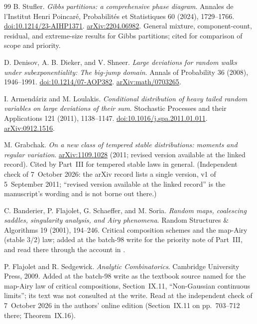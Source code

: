 \documentclass[11pt]{article}
\theoremstyle{remark}\newtheorem{remark}[theorem]{Remark}
\theoremstyle{definition}\newtheorem{definition}[theorem]{Definition}
\begin{document}
\begin{thebibliography}{99}
B. Stufler.
\emph{Gibbs partitions: a comprehensive phase diagram}.
Annales de l'Institut Henri Poincar\'e, Probabilit\'es et Statistiques
60 (2024), 1729--1766.
\href{https://doi.org/10.1214/23-AIHP1371}{doi:10.1214/23-AIHP1371}.
\href{https://arxiv.org/abs/2204.06982}{arXiv:2204.06982}.
General mixture, component-count, residual, and extreme-size results
for Gibbs partitions; cited for comparison of scope and priority.

D. Denisov, A. B. Dieker, and V. Shneer.
\emph{Large deviations for random walks under subexponentiality:
The big-jump domain}.
Annals of Probability 36 (2008), 1946--1991.
\href{https://doi.org/10.1214/07-AOP382}{doi:10.1214/07-AOP382}.
\href{https://arxiv.org/abs/math/0703265}{arXiv:math/0703265}.

I. Armend\'ariz and M. Loulakis.
\emph{Conditional distribution of heavy tailed random variables
on large deviations of their sum}.
Stochastic Processes and their Applications 121 (2011), 1138--1147.
\href{https://doi.org/10.1016/j.spa.2011.01.011}{doi:10.1016/j.spa.2011.01.011}.
\href{https://arxiv.org/abs/0912.1516}{arXiv:0912.1516}.

M. Grabchak.
\emph{On a new class of tempered stable distributions: moments and regular variation}.
\href{https://arxiv.org/abs/1109.1028}{arXiv:1109.1028} (2011; revised version available at the linked record).
Cited by Part~III for tempered stable laws in general. (Independent check of 7~October 2026: the arXiv record lists a single version, v1 of 5~September 2011; ``revised version available at the linked record'' is the manuscript's wording and is not borne out there.)

C. Banderier, P. Flajolet, G. Schaeffer, and M. Soria.
\emph{Random maps, coalescing saddles, singularity analysis, and Airy phenomena}.
Random Structures \& Algorithms 19 (2001), 194--246.
Critical composition schemes and the map-Airy (stable $3/2$) law; added at the batch-98 write for the priority note of Part~III, and read there through the account in \cite{BKW}.

P. Flajolet and R. Sedgewick.
\emph{Analytic Combinatorics}.
Cambridge University Press, 2009.
Added at the batch-98 write as the textbook source named for the map-Airy law of critical compositions, Section~IX.11, ``Non-Gaussian continuous limits''; its text was not consulted at the write. Read at the independent check of 7~October 2026 in the authors' online edition (Section~IX.11 on pp.~703--712 there; Theorem~IX.16).


\end{thebibliography}
\end{document}

